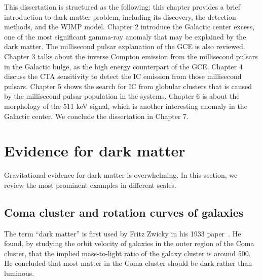 \documentclass[doublespace,nopageskip]{VTthesis} %
\begin{document}
This dissertation is structured as the following: this chapter provides a brief introduction to dark matter problem, including its discovery, the detection methods, and the WIMP model. Chapter 2 introduce the Galactic center excess, one of the most significant gamma-ray anomaly that may be explained by the dark matter. The millisecond pulsar explanation of the GCE is also reviewed. Chapter 3 talks about the inverse Compton emission from the millisecond pulsars in the Galactic bulge, as the high energy counterpart of the GCE. Chapter 4 discuss the CTA sensitivity to detect the IC emission from those millisecond pulsars. Chapter 5 shows the search for IC from globular clusters that is caused by the millisecond pulsar population in the systems. Chapter 6 is about the morphology of the 511 keV signal, which is another interesting anomaly in the Galactic center. We conclude the dissertation in Chapter 7.

\section{Evidence for dark matter} \label{se:one_section}

Gravitational evidence for dark matter is overwhelming. In this section, we review the most prominent examples in different scales.

\subsection{Coma cluster and rotation curves of galaxies} \label{sse:rotation_curve}

The term ``dark matter'' is first used by Fritz Zwicky in his 1933 paper~\cite{1933AcHPh...6..110Z}. He found, by studying the orbit velocity of galaxies in the outer region of the Coma cluster, that the implied mass-to-light ratio of the galaxy cluster is around 500. He concluded that most matter in the Coma cluster should be dark rather than luminous.
\end{document}
